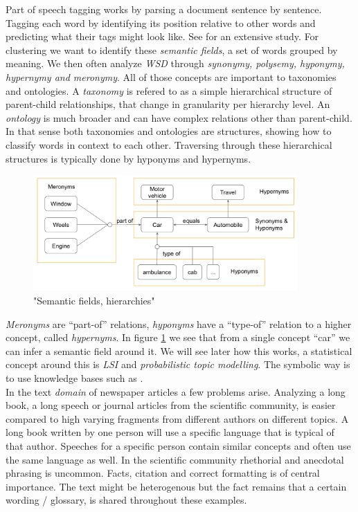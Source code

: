   Part of speech tagging works by parsing a document sentence by sentence. Tagging each word by identifying its position relative to other words and predicting what their tags might look like. See \cite{Nothing} for an extensive study.
  For clustering we want to identify these \emph{semantic fields}, a set of words grouped by meaning. We then often analyze \emph{WSD} through \emph{synonymy, polysemy, hyponymy, hypernymy and meronymy}. All of those concepts are important to taxonomies and ontologies. A \emph{taxonomy} is refered to as a simple hierarchical structure of parent-child relationships, that change in granularity per hierarchy level. An \emph{ontology} is much broader and can have complex relations other than parent-child. In that sense both taxonomies and ontologies are structures, showing how to classify words in context to each other. Traversing through these hierarchical structures is typically done by hyponyms and hypernyms. 

    \begin{figure}[h!]
      \centering
        \includegraphics[width=0.9\textwidth]{wsd_analysis.png}
        \caption{"Semantic fields, hierarchies"}
        \label{wsd_analysis}
    \end{figure} 

  \emph{Meronyms} are ``part-of'' relations, \emph{hyponyms} have a ``type-of'' relation to a higher concept, called \emph{hypernyms}. In figure \ref{wsd_analysis} we see that from a single concept ``car'' we can infer a semantic field around it. We will see later how this works, a statistical concept around this is \emph{LSI} and \emph{probabilistic topic modelling}. The symbolic way is to use knowledge bases such as \wordwiki{}.\\

  In the text \emph{domain} of newspaper articles a few problems arise. Analyzing a long book, a long speech or journal articles from the scientific community, is easier compared to high varying fragments from different authors on different topics. A long book written by one person will use a specific language that is typical of that author. Speeches for a specific person contain similar concepts and often use the same language as well. In the scientific community rhethorial and anecdotal phrasing is uncommon. Facts, citation and correct formatting is of central importance. The text might be heterogenous but the fact remains that a certain wording / glossary, is shared throughout these examples.\\

